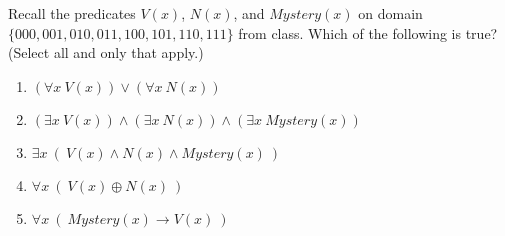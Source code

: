 
Recall the predicates $V(x)$, $N(x)$, and $Mystery(x)$
on domain $\{000,001,010,011,100,101,110,111\}$ from class.
Which of the following is true? (Select  all and only that apply.)
 \begin{enumerate}
    \item $\left( \forall x ~V(x) \right) \lor \left( \forall x ~N(x) \right)$
    \item $\left( \exists x ~V(x) \right) \land \left( \exists x~N(x) \right) \land \left( \exists x~Mystery(x)\right)$
    \item $\exists x ~(~V(x) \land N(x) \land Mystery(x)~)$
    \item $\forall x ~(~V(x) \oplus N(x)~)$
    \item $\forall x ~(~Mystery(x) \to V(x)~)$
 \end{enumerate}   